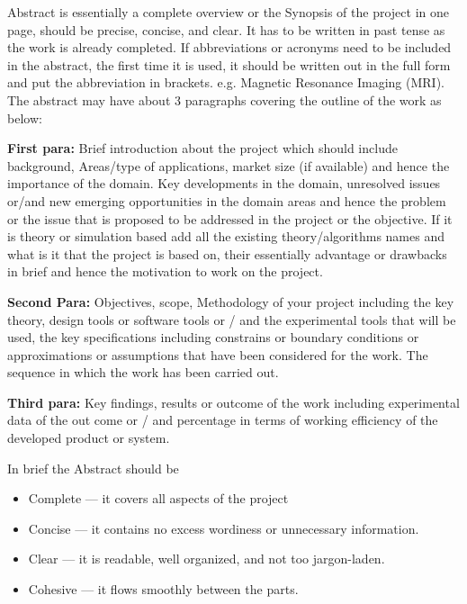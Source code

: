 \vspace{-1cm}
Abstract is essentially a complete overview or the Synopsis of the project in one page, should be precise, concise, and clear. It has to be written in past tense as the work is already completed. If abbreviations or acronyms need to be included in the abstract, the first time it is used, it should be written out in the full form and put the abbreviation in brackets. e.g. Magnetic Resonance Imaging (MRI). The abstract may have about 3 paragraphs covering the outline of the work as below:

\textbf{First para:} Brief introduction about the project which should include background, Areas/type of applications, market size (if available) and hence the importance of the domain. Key developments in the domain, unresolved issues or/and new emerging opportunities in the domain areas and hence the problem or the issue that is proposed to be addressed in the project or the objective. If it is theory or simulation based add all the existing theory/algorithms names and what is it that the project is based on, their essentially advantage or drawbacks in brief and hence the motivation to work on the project.

\textbf{Second Para:} Objectives, scope, Methodology of your project including the key theory, design tools or software tools or / and the experimental tools that will be used, the key specifications including constrains or boundary conditions or approximations or assumptions that have been considered for the work. The sequence in which the work has been carried out.

\textbf{Third para:} Key findings, results or outcome of the work including experimental data of the out come or / and percentage in terms of working efficiency of the developed product or system.

In brief the Abstract should be
\begin{itemize}
	\item Complete — it covers all aspects of the project
	\item Concise — it contains no excess wordiness or unnecessary information.
	\item Clear — it is readable, well organized, and not too jargon-laden.
	\item Cohesive — it flows smoothly between the parts.
\end{itemize}

\pagebreak